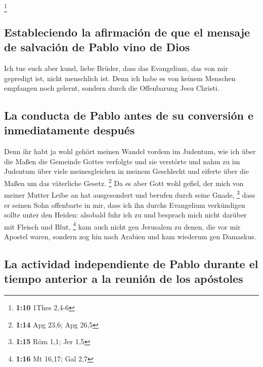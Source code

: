 \footnote{\textbf{1:10} 1Thes 2,4-6}

\hypertarget{estableciendo-la-afirmaciuxf3n-de-que-el-mensaje-de-salvaciuxf3n-de-pablo-vino-de-dios}{%
\subsection{Estableciendo la afirmación de que el mensaje de salvación
de Pablo vino de
Dios}\label{estableciendo-la-afirmaciuxf3n-de-que-el-mensaje-de-salvaciuxf3n-de-pablo-vino-de-dios}}

 Ich tue euch aber kund, liebe Brüder, dass das
Evangelium, das von mir gepredigt ist, nicht menschlich ist.
 Denn ich habe es von keinem Menschen empfangen noch
gelernt, sondern durch die Offenbarung Jesu Christi.

\hypertarget{la-conducta-de-pablo-antes-de-su-conversiuxf3n-e-inmediatamente-despuuxe9s}{%
\subsection{La conducta de Pablo antes de su conversión e inmediatamente
después}\label{la-conducta-de-pablo-antes-de-su-conversiuxf3n-e-inmediatamente-despuuxe9s}}

 Denn ihr habt ja wohl gehört meinen Wandel vordem im
Judentum, wie ich über die Maßen die Gemeinde Gottes verfolgte und sie
verstörte  und nahm zu im Judentum über viele
meinesgleichen in meinem Geschlecht und eiferte über die Maßen um das
väterliche Gesetz. \footnote{\textbf{1:14} Apg 23,6; Apg 26,5}
 Da es aber Gott wohl gefiel, der mich von meiner Mutter
Leibe an hat ausgesondert und berufen durch seine Gnade, \footnote{\textbf{1:15}
  Röm 1,1; Jer 1,5}  dass er seinen Sohn offenbarte in
mir, dass ich ihn durchs Evangelium verkündigen sollte unter den Heiden:
alsobald fuhr ich zu und besprach mich nicht darüber mit Fleisch und
Blut, \footnote{\textbf{1:16} Mt 16,17; Gal 2,7}  kam
auch nicht gen Jerusalem zu denen, die vor mir Apostel waren, sondern
zog hin nach Arabien und kam wiederum gen Damaskus.

\hypertarget{la-actividad-independiente-de-pablo-durante-el-tiempo-anterior-a-la-reuniuxf3n-de-los-apuxf3stoles}{%
\subsection{La actividad independiente de Pablo durante el tiempo
anterior a la reunión de los
apóstoles}\label{la-actividad-independiente-de-pablo-durante-el-tiempo-anterior-a-la-reuniuxf3n-de-los-apuxf3stoles}}

